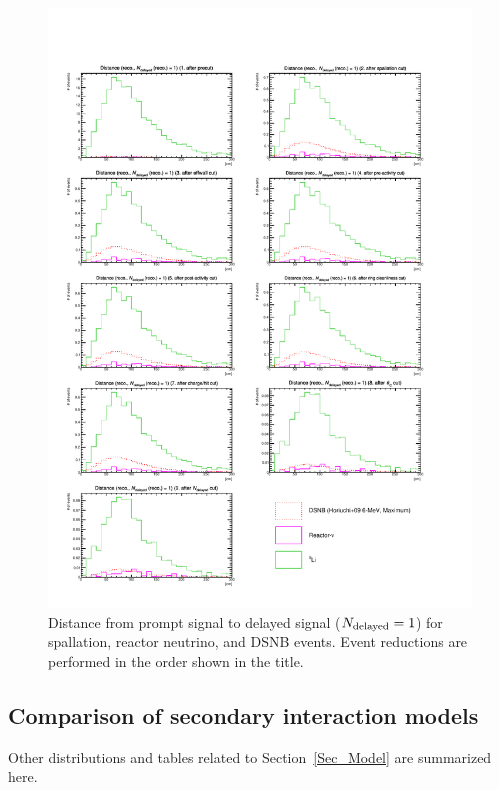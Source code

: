 \begin{figure}[h]
	\centering
	\includegraphics[width=15cm]{PDF/Dist_Nuebar/Che_50deg_tag_ge1/RecoDisCap_1}
	\caption[Distance from prompt signal to delayed signal ($N_{\rm delayed}=1$) for spallation, reactor neutrino, and DSNB events]{
	Distance from prompt signal to delayed signal ($N_{\rm delayed}=1$) for spallation, reactor neutrino, and DSNB events.
	Event reductions are performed in the order shown in the title.
	}\label{Nuebar_RecoDisCap_1}
\end{figure}





\clearpage
\subsection{Comparison of secondary interaction models}\label{App_Model}
\vs\hs
Other distributions and tables related to Section~\ref{Sec_Model} are summarized here.

